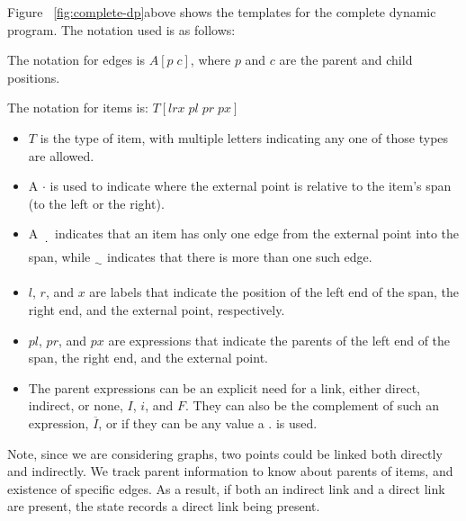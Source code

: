 \begin{figure*}
\vspace{-5mm}

\vspace{-12mm}
\caption{
  \label{fig:complete-dp}
  Complete dynamic program. For definitions of symbols see the text.
}
\end{figure*}

Figure ~\ref{fig:complete-dp}above shows the templates for the complete dynamic program.
The notation used is as follows:

The notation for edges is $A[p \; c]$, where $p$ and $c$ are the parent and child positions.

The notation for items is: $T[lrx \; pl \; pr \; px]$

\begin{itemize}
  \item $T$ is the type of item, with multiple letters indicating any one of those types are allowed.
  \item A $\cdotp$ is used to indicate where the external point is relative to the item's span (to the left or the right).
  \item A $\dotuline{\hspace{2mm}}$ indicates that an item has only one edge from the external point into the span, while $\uwave{\hspace{2mm}}$ indicates that there is more than one such edge.
  \item $l$, $r$, and $x$ are labels that indicate the position of the left end of the span, the right end, and the external point, respectively.
  \item $pl$, $pr$, and $px$ are expressions that indicate the parents of the left end of the span, the right end, and the external point.
  \item The parent expressions can be an explicit need for a link, either direct, indirect, or none, \myeg $I$, $i$, and $F$.
  They can also be the complement of such an expression, \myeg $\overline{I}$, or if they can be any value a $.$ is used.
\end{itemize}

Note, since we are considering graphs, two points could be linked both directly and indirectly.
We track parent information to know about parents of items, and existence of specific edges.
As a result, if both an indirect link and a direct link are present, the state records a direct link being present.

